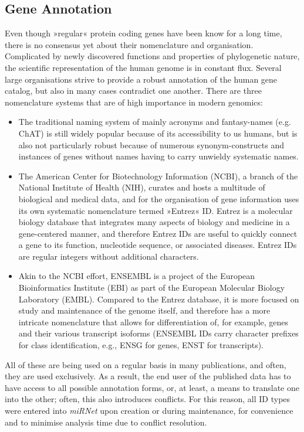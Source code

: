 \subsection{Gene Annotation}
Even though »regular« protein coding genes have been know for a long time, there is no consensus yet about their nomenclature and organisation. Complicated by newly discovered functions and properties of phylogenetic nature, the scientific representation of the human genome is in constant flux. Several large organisations strive to provide a robust annotation of the human gene catalog, but also in many cases contradict one another. There are three nomenclature systems that are of high importance in modern genomics: 
\begin{itemize}
\item The traditional naming system of mainly acronyms and fantasy-names (e.g. ChAT) is still widely popular because of its accessibility to us humans, but is also not particularly robust because of numerous synonym-constructs and instances of genes without names having to carry unwieldy systematic names.
\item The American Center for Biotechnology Information (NCBI), a branch of the National Institute of Health (NIH), curates and hosts a multitude of biological and medical data, and for the organisation of gene information uses its own systematic nomenclature termed »Entrez« ID. Entrez is a molecular biology database that integrates many aspects of biology and medicine in a gene-centered manner, and therefore Entrez IDs are useful to quickly connect a gene to its function, nucleotide sequence, or associated diseases. Entrez IDs are regular integers without additional characters.
\item Akin to the NCBI effort, ENSEMBL is a project of the European Bioinformatics Institute (EBI) as part of the European Molecular Biology Laboratory (EMBL). Compared to the Entrez database, it is more focused on study and maintenance of the genome itself, and therefore has a more intricate nomenclature that allows for differentiation of, for example, genes and their various transcript isoforms (ENSEMBL IDs carry character prefixes for class identification, e.g., ENSG for genes, ENST for transcripts).
\end{itemize}
All of these are being used on a regular basis in many publications, and often, they are used exclusively. As a result, the end user of the published data has to have access to all possible annotation forms, or, at least, a means to translate one into the other; often, this also introduces conflicts. For this reason, all ID types were entered into \textit{miRNet} upon creation or during maintenance, for convenience and to minimise analysis time due to conflict resolution.

